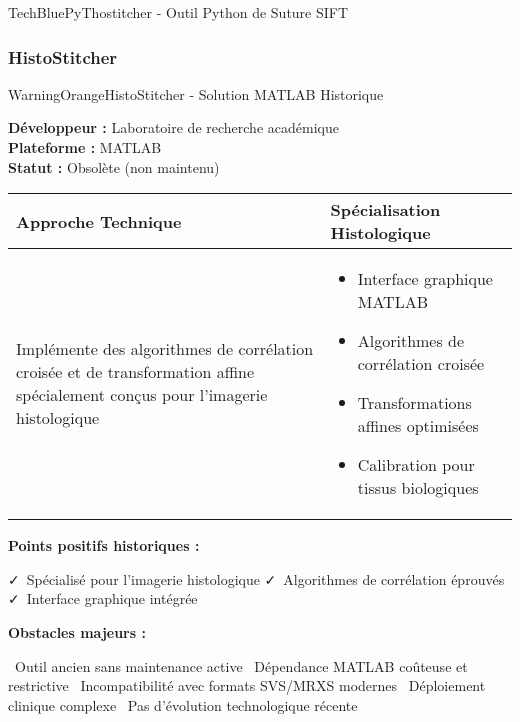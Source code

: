 \documentclass[12pt,a4paper]{report}
\newcommand{\pro}[1]{\textcolor{SuccessGreen}{\faCheck\ #1}}
\newcommand{\con}[1]{\textcolor{DangerRed}{\faTimes\ #1}}
\begin{document}
\begin{}
\begin{}
\begin{}
\begin{techbox}{TechBlue}{PyThostitcher - Outil Python de Suture SIFT}
\end{techbox}

\subsubsection{HistoStitcher}

\begin{techbox}{WarningOrange}{HistoStitcher - Solution MATLAB Historique}

\textbf{Développeur :} Laboratoire de recherche académique \\
\textbf{Plateforme :} MATLAB \\
\textbf{Statut :} Obsolète (non maintenu)

\vspace{0.5cm}

\begin{tabularx}{\textwidth}{|X|X|}
\hline
\rowcolor{LightGray}
\textbf{Approche Technique} & \textbf{Spécialisation Histologique} \\
\hline
Implémente des algorithmes de corrélation croisée et de transformation affine spécialement conçus pour l'imagerie histologique &
\begin{itemize}[nosep]
\item Interface graphique MATLAB
\item Algorithmes de corrélation croisée
\item Transformations affines optimisées
\item Calibration pour tissus biologiques
\end{itemize} \\
\hline
\end{tabularx}

\vspace{0.5cm}

\textbf{Points positifs historiques :}
\begin{itemize}[leftmargin=*]
    \pro{Spécialisé pour l'imagerie histologique}
    \pro{Algorithmes de corrélation éprouvés}
    \pro{Interface graphique intégrée}
\end{itemize}

\textbf{Obstacles majeurs :}
\begin{itemize}[leftmargin=*]
    \con{Outil ancien sans maintenance active}
    \con{Dépendance MATLAB coûteuse et restrictive}
    \con{Incompatibilité avec formats SVS/MRXS modernes}
    \con{Déploiement clinique complexe}
    \con{Pas d'évolution technologique récente}
\end{itemize}


\end{techbox}
\end{}
\end{}
\end{}
\end{document}
